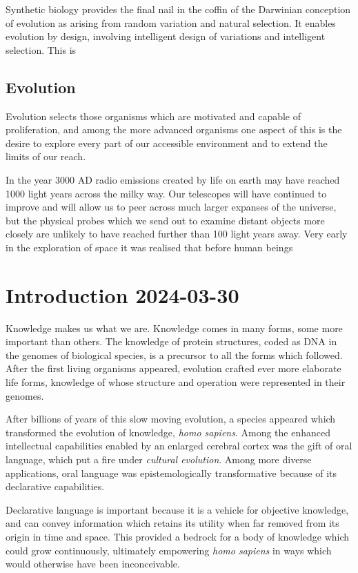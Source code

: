 \documentclass[10pt,titlepage]{book}
\begin{document}
Synthetic biology provides the final nail in the coffin of the Darwinian conception of evolution as arising from random variation and natural selection.
It enables evolution by design, involving intelligent design of variations and intelligent selection.
This is 



\section{Evolution}


Evolution selects those organisms which are motivated and capable of proliferation, and among the more advanced organisms one aspect of this is the desire to explore every part of our accessible environment and to extend the limits of our reach.

In the year 3000 AD radio emissions created by life on earth may have reached 1000 light years across the milky way.
Our telescopes will have continued to improve and will allow us to peer across much larger expanses of the universe, but the physical probes which we send out to examine distant objects more closely are unlikely to have reached further than 100 light years away.
Very early in the exploration of space it was realised that before human beings



\chapter{Introduction 2024-03-30}

Knowledge makes us what we are.
Knowledge comes in many forms, some more important than others.
The knowledge of protein structures, coded as DNA in the genomes of biological species, is a precursor to all the forms which followed.
After the first living organisms appeared, evolution crafted ever more elaborate life forms, knowledge of whose structure and operation were represented in their genomes.

After billions of years of this slow moving evolution, a species appeared which transformed the evolution of knowledge, \emph{homo sapiens}.
Among the enhanced intellectual capabilities enabled by an enlarged cerebral cortex was the gift of oral language, which put a fire under \emph{cultural evolution}.
Among more diverse applications, oral language was epistemologically transformative because of its declarative capabilities.

Declarative language is important because it is a vehicle for objective knowledge, and can convey information which retains its utility when far removed from its origin in time and space.
This provided a bedrock for a body of knowledge which could grow continuously, ultimately empowering \emph{homo sapiens} in ways which would otherwise have been inconceivable.
\end{document}
